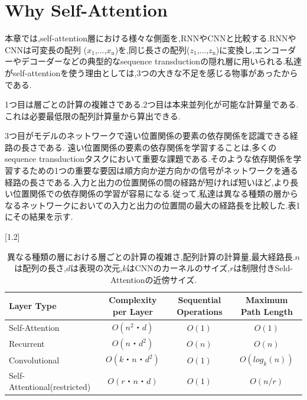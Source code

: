 \documentclass{jarticle}     %
\begin{document}
\section{Why Self-Attention}

本章では,self-attention層における様々な側面を,RNNやCNNと比較する.RNNやCNNは可変長の配列
($x_\mathrm{1}$,...,$x_\mathrm{n}$)を,同じ長さの配列($z_\mathrm{1}$,...,$z_\mathrm{n}$)に変換し,エンコーダーやデコーダーなどの典型的なsequence transductionの隠れ層に用いられる.私達がself-attentionを使う理由としては,3つの大きな不足を感じる物事があったからである.
\par
1つ目は層ごとの計算の複雑さである.2つ目は本来並列化が可能な計算量である.これは必要最低限の配列計算量から算出できる.
\par
3つ目がモデルのネットワークで遠い位置関係の要素の依存関係を認識できる経路の長さである.
遠い位置関係の要素の依存関係を学習することは,多くのsequence transductionタスクにおいて重要な課題である.そのような依存関係を学習するための1つの重要な要因は順方向か逆方向かの信号がネットワークを通る経路の長さである.入力と出力の位置関係の間の経路が短ければ短いほど,より長い位置関係での依存関係の学習が容易になる.従って,私達は異なる種類の層からなるネットワークにおいての入力と出力の位置間の最大の経路長を比較した.表1にその結果を示す.

\begin{table}[hbtp]
  \caption{異なる種類の層における層ごとの計算の複雑さ,配列計算の計算量,最大経路長.$n$は配列の長さ,$d$は表現の次元,$k$はCNNのカーネルのサイズ,$r$は制限付きSeld-Attentionの近傍サイズ.}
  \label{table:path length}
  \small
  \centering
  \scalebox{1.2}[1.2]{
    \begin{tabular}{lccc}
      \hline
      Layer Type  & Complexity per Layer  &  Sequential Operations & Maximum Path Length \\
      \hline 
      Self-Attention  & $O(n^2・d)$  & $O(1)$ & $O(1)$ \\
      Recurrent  & $O(n・d^2)$   & $O(n)$ & $O(n)$ \\
      Convolutional  & $O(k・n・d^2)$  & $O(1)$ & $O(log_k(n))$ \\
      Self-Attentional(restricted)  &  $O(r・n・d)$  &  $O(1)$ & $O(n/r)$ \\
      \hline
    \end{tabular}
  }
  
\end{table}
\end{document}
